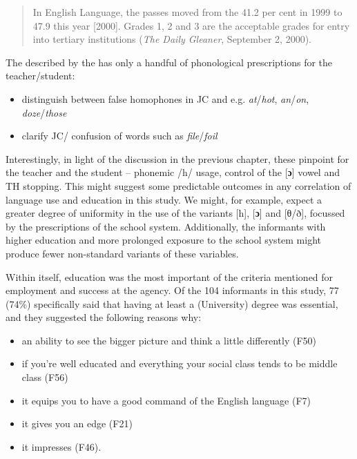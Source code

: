 \begin{quote}
	In English Language, the passes moved from the 41.2 per cent in 1999 to 47.9 this year [2000]. Grades 1, 2 and 3 are the acceptable grades for entry into tertiary institutions (\textit{The Daily Gleaner}, September 2, 2000).
\end{quote}

The  described by the \citet[17]{Curriculum1999} has only a handful of phonological prescriptions for the teacher\slash student:

\begin{itemize}
\item 
distinguish between false homophones in JC and  e.g. \textit{at}\slash\textit{hot}, \textit{an}\slash\textit{on}, \textit{doze}\slash\textit{those}
\item 
clarify JC\slash {} confusion of words such as \textit{file}\slash\textit{foil}
\end{itemize}

Interestingly, in light of the discussion in the previous chapter, these pinpoint for the teacher and the student – phonemic /h/ usage, control of the [\textbf{ɔ}] vowel and TH stopping.  This might suggest some predictable outcomes in any correlation of language use and education in this study.  We might, for example, expect a greater degree of uniformity in the use of the variants [h], [\textbf{ɔ}] and [θ/ð], focussed by the prescriptions of the school system.  Additionally, the informants with higher education and more prolonged exposure to the school system might produce fewer non-stan\-dard variants of these variables.    

Within  itself, education was the most important of the criteria mentioned for employment and success at the agency.  Of the 104 informants in this study, 77 (74\%) specifically said that having at least a (University) degree was essential, and they suggested the following reasons why:

\begin{itemize}
\item{} an ability to see the bigger picture and think a little differently (F50)
\item if you’re well educated and everything your social class tends to be middle class (F56)
\item it equips you to have a good command of the English language (F7)
\item it gives you an edge (F21)
\item it impresses (F46).
\end{itemize}

